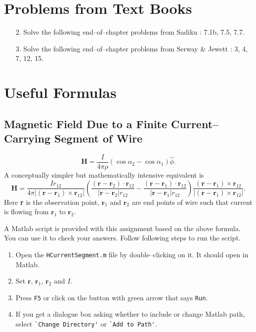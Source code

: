 \documentclass[12pt,a4paper]{article}
\begin{document}
\section{Problems from Text Books}
\begin{itemize}
\item[2.] Solve the following end--of--chapter problems from Sadiku \cite[Ch. 7, pg. 296--297]{Sadiku}: 7.1b, 7.5, 7.7.
\item[3.] Solve the following end--of--chapter problems from Serway \& Jewett \cite[Ch. 30, pg. 957--958]{Serway}: 3, 4, 7, 12, 15.
\end{itemize}
\section{Useful Formulas}
\subsection{Magnetic Field Due to a Finite Current--Carrying Segment of Wire}
\begin{equation}
\textbf{H}=\dfrac{I}{4\pi\rho}(\cos\alpha_2-\cos\alpha_1)\hat\phi.
\end{equation}
A conceptually simpler but mathematically intensive equivalent is
\begin{equation}
\textbf{H}=\dfrac{Ir_{12}}{4\pi|(\textbf{r}-\textbf{r}_1)\times\textbf{r}_{12}|}\left(\dfrac{(\textbf{r}-\textbf{r}_2)\cdot\textbf{r}_{12}}{|\textbf{r}-\textbf{r}_2|r_{12}}-\dfrac{(\textbf{r}-\textbf{r}_1)\cdot\textbf{r}_{12}}{|\textbf{r}-\textbf{r}_1|r_{12}}\right)\dfrac{(\textbf{r}-\textbf{r}_1)\times\textbf{r}_{12}}{|(\textbf{r}-\textbf{r}_1)\times \textbf{r}_{12}|}.
\end{equation}
Here \textbf{r} is the observation point, $\textbf{r}_1$ and $\textbf{r}_2$ are end points of wire such that current is flowing from $\textbf{r}_1$ to $\textbf{r}_2$.

A Matlab script is provided with this assignment based on the above formula. You can use it to check your answers. Follow following steps to run the script.
\begin{enumerate}
\item Open the \verb|HCurrentSegment.m| file by double--clicking on it. It should open in Matlab.
\item Set $\textbf{r}$, $\textbf{r}_1$, $\textbf{r}_2$ and $I$.
\item Press \verb|F5| or click on the button with green arrow that says \verb|Run|.
\item If you get a dialogue box asking whether to include or change Matlab path, select \verb|`Change Directory'| or \verb|`Add to Path'|.
\end{enumerate}
\end{document}
